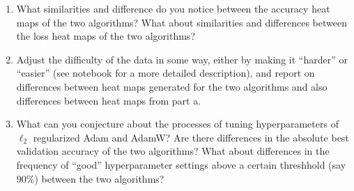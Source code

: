 \begin{enumerate}[(a)]
{\begin{enumerate}
    \item What similarities and difference do you notice between the accuracy heat maps of the two algorithms? What about similarities and differences between the loss heat maps of the two algorithms?
    \item Adjust the difficulty of the data in some way, either by making it ``harder'' or ``easier'' (see notebook for a more detailed description), and report on differences between heat maps generated for the two algorithms and also differences between heat maps from part a. 
    \item What can you conjecture about the processes of tuning hyperparameters of $\ell_2$ regularized Adam and AdamW? Are there differences in the absolute best validation accuracy of the two algorithms? What about differences in the frequency of ``good'' hyperparameter settings above a certain threshhold (say $90\%$) between the two algorithms?  
\end{enumerate}
}

\sol{
        
}
\end{enumerate}
